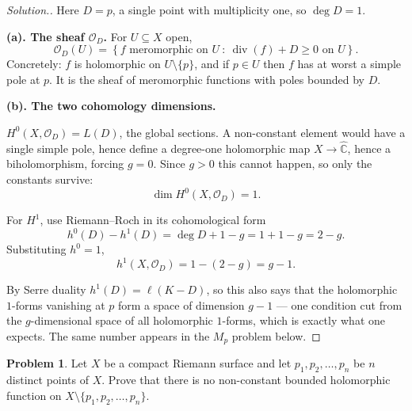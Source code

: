 \documentclass[11pt,a4paper]{article}
\theoremstyle{definition}
\newtheorem{problemx}{Problem}[section]
\newenvironment{problem}{\begin{problemx}}{\end{problemx}}
\newenvironment{solution}
  {\renewcommand{\qedsymbol}{}\begin{proof}[\textit{Solution}.]}
  {\end{proof}}
\begin{document}
\begin{solution}
Here $D = p$, a single point with multiplicity one, so $\deg D = 1$.

\textbf{(a). The sheaf $\mathcal{O}_D$.} For $U \subseteq X$ open,
$$\mathcal{O}_D(U) = \left\{ f \text{ meromorphic on } U \ :\
\operatorname{div}(f) + D \geq 0 \text{ on } U\right\}.$$
Concretely: $f$ is holomorphic on $U \setminus \{p\}$, and if $p \in U$ then $f$ has
at worst a simple pole at $p$. It is the sheaf of meromorphic functions with poles
bounded by $D$.

\textbf{(b). The two cohomology dimensions.}

$H^{0}(X,\mathcal{O}_D) = L(D)$, the global sections. A non-constant element would
have a single simple pole, hence define a degree-one holomorphic map
$X \rightarrow \widehat{\mathbb{C}}$, hence a biholomorphism, forcing $g = 0$.
Since $g > 0$ this cannot happen, so only the constants survive:
$$\boxed{\dim H^{0}(X,\mathcal{O}_D) = 1 .}$$

For $H^{1}$, use Riemann--Roch in its cohomological form
$$h^{0}(D) - h^{1}(D) = \deg D + 1 - g = 1 + 1 - g = 2 - g .$$
Substituting $h^{0} = 1$,
$$\boxed{h^{1}(X,\mathcal{O}_D) = 1 - (2-g) = g - 1 .}$$

By Serre duality $h^{1}(D) = \ell(K-D)$, so this also says that the holomorphic
$1$-forms vanishing at $p$ form a space of dimension $g-1$ --- one condition cut from
the $g$-dimensional space of all holomorphic $1$-forms, which is exactly what one
expects. The same number appears in the $M_p$ problem below.
\end{solution}


\begin{problem}
Let $X$ be a compact Riemann surface and let $p_1, p_2, \ldots, p_n$ be $n$
distinct points of $X$. Prove that there is no non-constant bounded holomorphic
function on $X \setminus \{p_1, p_2, \ldots, p_n\}$.
\end{problem}
\end{document}
